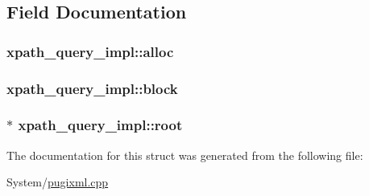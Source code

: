 \subsection{Field Documentation}
\hypertarget{structxpath__query__impl_ae568b8642d48e729f2ccc2a50467c847}{
\subsubsection[{alloc}]{ xpath\-\_\-query\-\_\-impl\-::alloc}}\label{structxpath__query__impl_ae568b8642d48e729f2ccc2a50467c847}
\hypertarget{structxpath__query__impl_a3a8af3ceed6a504567656ec6d1b62641}{
\subsubsection[{block}]{ xpath\-\_\-query\-\_\-impl\-::block}}\label{structxpath__query__impl_a3a8af3ceed6a504567656ec6d1b62641}
\hypertarget{structxpath__query__impl_ad25499e0c8391005e3a1a60633d631fe}{
\subsubsection[{root}]{$\ast$ xpath\-\_\-query\-\_\-impl\-::root}}\label{structxpath__query__impl_ad25499e0c8391005e3a1a60633d631fe}


The documentation for this struct was generated from the following file\-:\begin{DoxyCompactItemize}
\item 
System/\hyperlink{pugixml_8cpp}{pugixml.\-cpp}\end{DoxyCompactItemize}
